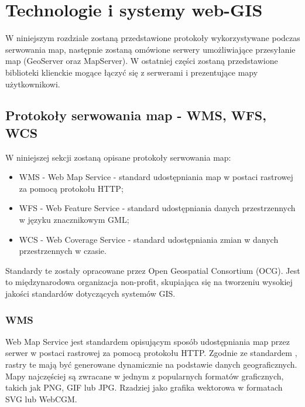 \chapter{Technologie i systemy web-GIS}
W niniejszym rozdziale zostaną przedstawione protokoły wykorzystywane podczas serwowania map, następnie zostaną omówione serwery umożliwiające przesyłanie map (GeoServer oraz MapServer).
W ostatniej części zostaną przedstawione biblioteki klienckie mogące łączyć się z serwerami i prezentujące mapy użytkownikowi.

\section{Protokoły serwowania map - WMS, WFS, WCS}
\label{chap:protokoly}

W niniejszej sekcji zostaną opisane protokoły serwowania map:
\begin{itemize}
\item WMS - Web Map Service - standard udostępniania map w postaci rastrowej za pomocą protokołu HTTP;
\item WFS - Web Feature Service - standard udostępniania danych przestrzennych w języku znacznikowym GML;
\item WCS - Web Coverage Service - standard udostępniania zmian w danych przestrzennych w czasie.
\end{itemize}

Standardy te zostały opracowane przez Open Geospatial Consortium (OCG). Jest to międzynarodowa organizacja non-profit, skupiająca się na tworzeniu wysokiej jakości standardów dotyczących systemów GIS.

\subsection{WMS}
Web Map Service jest standardem opisującym sposób udostępniania map przez serwer w postaci rastrowej za pomocą protokołu HTTP.
Zgodnie ze standardem \cite{OpenGIS_WMS2006}, rastry te mają być generowane dynamicznie na podstawie danych geograficznych.
Mapy najczęściej są zwracane w jednym z popularnych formatów graficznych, takich jak PNG, GIF lub JPG. Rzadziej jako grafika wektorowa w formatach SVG lub WebCGM.

